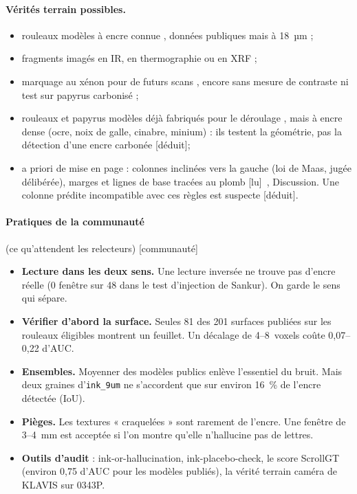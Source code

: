 \documentclass[11pt,a4paper]{article}
\newcommand{\lu}{\textsf{\small[lu]}}
\newcommand{\deduit}{\textsf{\small[déduit]}}
\newcommand{\commu}{\textsf{\small[communauté]}}
\begin{document}
\paragraph{Vérités terrain possibles.}
\begin{itemize}
  \item rouleaux modèles à encre connue \cite{seiler2026}, données publiques mais à 18~µm ;
  \item fragments imagés en IR, en thermographie ou en XRF \cite{ceccarelli2025,romano2023} ;
  \item marquage au xénon pour de futurs scans \cite{hoffmann2025,hoffmann2026}, encore sans
  mesure de contraste ni test sur papyrus carbonisé ;
  \item rouleaux et papyrus modèles déjà fabriqués pour le déroulage
  \cite{seales2004,lin2005,allegra2015,baum2017}, mais à encre dense (ocre, noix de galle,
  cinabre, minium) : ils testent la géométrie, pas la détection d'une encre carbonée \deduit ;
  \item a priori de mise en page : colonnes inclinées vers la gauche (loi de Maas, jugée
  délibérée), marges et lignes de base tracées au plomb \lu~\cite{romano2023}, Discussion.
  Une colonne prédite incompatible avec ces règles est suspecte \deduit.
\end{itemize}

\paragraph{Pratiques de la communauté} (ce qu'attendent les relecteurs) \commu
\begin{itemize}
  \item \textbf{Lecture dans les deux sens.} Une lecture inversée ne trouve pas d'encre réelle
  (0 fenêtre sur 48 dans le test d'injection de Sankur). On garde le sens qui sépare.
  \item \textbf{Vérifier d'abord la surface.} Seules 81 des 201 surfaces publiées sur les
  rouleaux éligibles montrent un feuillet. Un décalage de 4–8~voxels coûte 0,07–0,22 d'AUC.
  \item \textbf{Ensembles.} Moyenner des modèles publics enlève l'essentiel du bruit. Mais deux
  graines d'\texttt{ink\_9um} ne s'accordent que sur environ 16~\% de l'encre détectée (IoU).
  \item \textbf{Pièges.} Les textures « craquelées » sont rarement de l'encre. Une fenêtre de
  3–4~mm est acceptée si l'on montre qu'elle n'hallucine pas de lettres.
  \item \textbf{Outils d'audit} : ink-or-hallucination, ink-placebo-check, le score ScrollGT
  (environ 0,75 d'AUC pour les modèles publiés), la vérité terrain caméra de KLAVIS sur 0343P.
\end{itemize}
\end{document}
